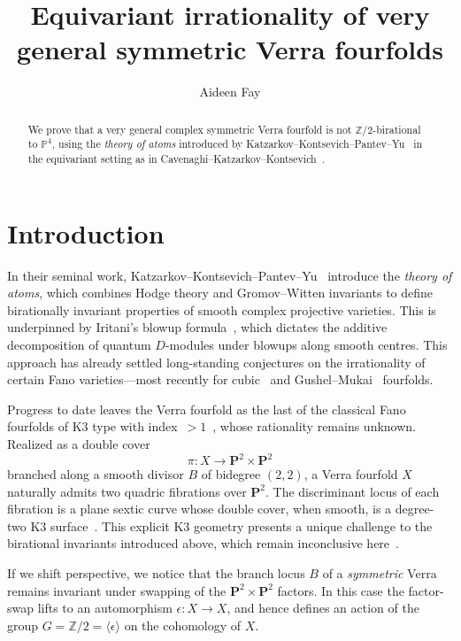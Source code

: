 \documentclass{amsart}
\author[]{Aideen Fay}
\title{Equivariant irrationality of very general symmetric Verra fourfolds}
\theoremstyle{definition}
\theoremstyle{remark}
\newcommand{\ZZ}{\mathbb Z}
\newcommand{\PP}{\mathbb P}
\begin{document}
\pagestyle{plain}

\begin{abstract}

We prove that a very general complex symmetric Verra fourfold is not \(\ZZ/2\)-birational to \(\PP^4\), using the \emph{theory of atoms} introduced by Katzarkov--Kontsevich--Pantev--Yu~\citep{Katzarkov2025BirationalIF} in the equivariant setting as in Cavenaghi--Katzarkov--Kontsevich~\citep{cavenaghi2026atomsmeetsymbols}.

\end{abstract}


\maketitle

\section{Introduction}
\label{sec:intro}
In their seminal work, Katzarkov--Kontsevich--Pantev--Yu~\citep{Katzarkov2025BirationalIF} introduce the \emph{theory of atoms}, which combines Hodge theory and Gromov--Witten invariants to define birationally invariant properties of smooth complex projective varieties. This is underpinned by Iritani's blowup formula~\cite[Theorem 1.1]{Iritani2023QuantumCO}, which dictates the additive decomposition of quantum $D$-modules under blowups along smooth centres. This approach has already settled long-standing conjectures on the irrationality of certain Fano varieties---most recently for cubic~\cite{Katzarkov2025BirationalIF, guere2026irrationality} and Gushel--Mukai~\cite{Benedetti2026QuantumCA} fourfolds.

Progress to date leaves the Verra fourfold as the last of the classical Fano fourfolds of K3 type with index~$>1$~\cite{AIF_0__0_0_A50_0}, whose rationality remains unknown. Realized as a double cover
\[
  \pi \colon X \to \mathbf{P}^2 \times \mathbf{P}^2
\]
branched along a smooth divisor \(B\) of bidegree \((2,2)\), a Verra fourfold \(X\) naturally admits two quadric fibrations over \(\mathbf{P}^2\). The discriminant locus of each fibration is a plane sextic curve whose double cover, when smooth, is a
degree-two K3 surface~\citep{Laterveer2019AlgebraicCA}. This explicit K3 geometry presents a unique challenge to the birational invariants introduced above, which remain inconclusive here~\cite{Benedetti26Verra}.

If we shift perspective, we notice that the branch locus \(B\) of a \emph{symmetric} Verra remains invariant under swapping of the \(\mathbf P^2\times \mathbf P^2\) factors. In this
case the factor-swap lifts to an automorphism $\epsilon:X\longrightarrow X$, and hence defines an action of the group $G = \ZZ/2 = \langle \epsilon \rangle$ on the cohomology of $X$. 
\end{document}
